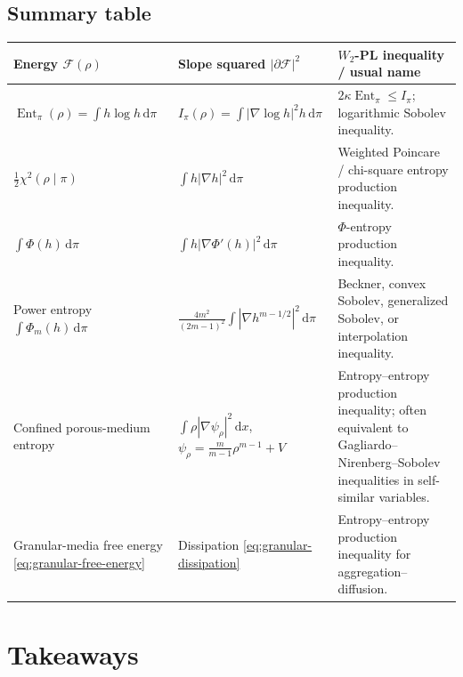 \documentclass[11pt]{article}
\theoremstyle{definition}
\DeclareMathOperator{\Ent}{Ent}
\newcommand{\F}{\mathcal F}
\newcommand{\W}{W_2}
\newcommand{\dd}{\,\mathrm d}
\begin{document}
\subsection{Summary table}

\begin{center}
\renewcommand{\arraystretch}{1.35}
\footnotesize
\begin{tabular}{>{\raggedright\arraybackslash}p{} >{\raggedright\arraybackslash}p{} >{\raggedright\arraybackslash}p{}}
\toprule
Energy $\F(\rho)$ & Slope squared $|\partial\F|^2$ & $\W$-PL inequality / usual name \\
\midrule
$\Ent_\pi(\rho)=\int h\log h\dd\pi$ & $I_\pi(\rho)=\int |\nabla\log h|^2h\dd\pi$ & $2\kappa\Ent_\pi\le I_\pi$; logarithmic Sobolev inequality. \\
$\frac12\chi^2(\rho\mid\pi)$ & $\int h|\nabla h|^2\dd\pi$ & Weighted Poincare / chi-square entropy production inequality. \\
$\int \Phi(h)\dd\pi$ & $\int h|\nabla\Phi'(h)|^2\dd\pi$ & $\Phi$-entropy production inequality. \\
Power entropy $\int \Phi_m(h)\dd\pi$ & $\frac{4m^2}{(2m-1)^2}\int |\nabla h^{m-1/2}|^2\dd\pi$ & Beckner, convex Sobolev, generalized Sobolev, or interpolation inequality. \\
Confined porous-medium entropy & $\int \rho|\nabla\psi_\rho|^2\dd x$, $\psi_\rho=\frac{m}{m-1}\rho^{m-1}+V$ & Entropy--entropy production inequality; often equivalent to Gagliardo--Nirenberg--Sobolev inequalities in self-similar variables. \\
Granular-media free energy \eqref{eq:granular-free-energy} & Dissipation \eqref{eq:granular-dissipation} & Entropy--entropy production inequality for aggregation--diffusion. \\
\bottomrule
\end{tabular}
\normalsize
\end{center}


\section{Takeaways}
\end{document}
